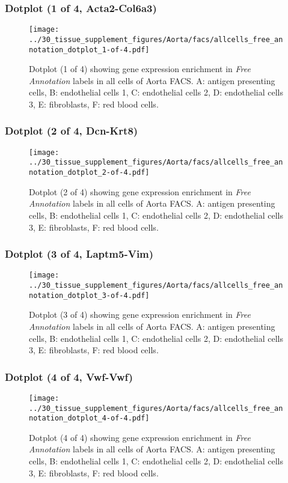 \subsubsection{Dotplot (1 of 4, Acta2-Col6a3)}
\begin{figure}[h]
\centering
\texttt{[image: ../30\_tissue\_supplement\_figures/Aorta/facs/allcells\_free\_annotation\_dotplot\_1-of-4.pdf]}

\caption{ Dotplot (1 of 4)  showing gene expression enrichment in \emph{Free Annotation} labels in all cells of Aorta FACS. A: antigen presenting cells, B: endothelial cells 1, C: endothelial cells 2, D: endothelial cells 3, E: fibroblasts, F: red blood cells.}
\end{figure}


\clearpage

\subsubsection{Dotplot (2 of 4, Dcn-Krt8)}
\begin{figure}[h]
\centering
\texttt{[image: ../30\_tissue\_supplement\_figures/Aorta/facs/allcells\_free\_annotation\_dotplot\_2-of-4.pdf]}

\caption{ Dotplot (2 of 4)  showing gene expression enrichment in \emph{Free Annotation} labels in all cells of Aorta FACS. A: antigen presenting cells, B: endothelial cells 1, C: endothelial cells 2, D: endothelial cells 3, E: fibroblasts, F: red blood cells.}
\end{figure}


\clearpage

\subsubsection{Dotplot (3 of 4, Laptm5-Vim)}
\begin{figure}[h]
\centering
\texttt{[image: ../30\_tissue\_supplement\_figures/Aorta/facs/allcells\_free\_annotation\_dotplot\_3-of-4.pdf]}

\caption{ Dotplot (3 of 4)  showing gene expression enrichment in \emph{Free Annotation} labels in all cells of Aorta FACS. A: antigen presenting cells, B: endothelial cells 1, C: endothelial cells 2, D: endothelial cells 3, E: fibroblasts, F: red blood cells.}
\end{figure}


\clearpage

\subsubsection{Dotplot (4 of 4, Vwf-Vwf)}
\begin{figure}[h]
\centering
\texttt{[image: ../30\_tissue\_supplement\_figures/Aorta/facs/allcells\_free\_annotation\_dotplot\_4-of-4.pdf]}

\caption{ Dotplot (4 of 4)  showing gene expression enrichment in \emph{Free Annotation} labels in all cells of Aorta FACS. A: antigen presenting cells, B: endothelial cells 1, C: endothelial cells 2, D: endothelial cells 3, E: fibroblasts, F: red blood cells.}
\end{figure}

